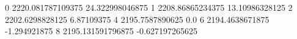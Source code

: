 0 2220.081787109375 24.322998046875
1 2208.86865234375 13.10986328125
2 2202.6298828125 6.87109375
4 2195.7587890625 0.0
6 2194.4638671875 -1.294921875
8 2195.131591796875 -0.627197265625
